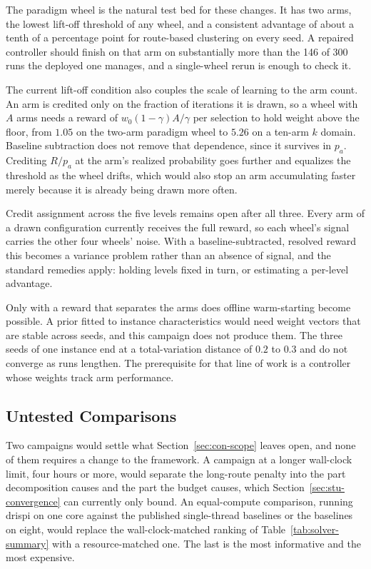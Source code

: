 The paradigm wheel is the natural test bed for these changes. It has two arms,
the lowest lift-off threshold of any wheel, and a consistent advantage of about
a tenth of a percentage point for route-based clustering on every seed. A
repaired controller should finish on that arm on substantially more than the
146 of 300 runs the deployed one manages, and a single-wheel rerun is enough to
check it.

The current lift-off condition also couples the scale of learning to the arm count. An
arm is credited only on the fraction of iterations it is drawn, so a wheel with
$A$ arms needs a reward of $w_0(1-\gamma)A/\gamma$ per selection to hold weight
above the floor, from $1.05$ on the two-arm paradigm wheel to $5.26$ on a
ten-arm $k$ domain. Baseline subtraction does not remove that dependence, since
it survives in $p_a$. Crediting $R/p_a$ at the arm's realized
probability goes further and equalizes the threshold as
the wheel drifts, which would also stop an arm accumulating faster merely
because it is already being drawn more often.

Credit assignment across the five levels remains open after all three. Every
arm of a drawn configuration currently receives the full reward, so each wheel's
signal carries the other four wheels' noise. With a baseline-subtracted,
resolved reward this becomes a variance problem rather than an absence of
signal, and the standard remedies apply: holding levels fixed in turn, or
estimating a per-level advantage.

Only with a reward that separates the arms does offline warm-starting become
possible. A prior fitted to instance characteristics would need weight vectors
that are stable across seeds, and this campaign does not produce them. The
three seeds of one instance end at a total-variation distance of $0.2$ to $0.3$ and do
not converge as runs lengthen. The prerequisite for that line of work is a
controller whose weights track arm performance.

\subsection{Untested Comparisons}
\label{sec:con-comparisons}

Two campaigns would settle what Section~\ref{sec:con-scope} leaves
open, and none of them requires a change to the framework. A
campaign at a longer wall-clock limit, four hours or more, would separate the
long-route penalty into the part decomposition causes and the part the budget
causes, which Section~\ref{sec:stu-convergence} can currently only bound.
An equal-compute comparison, running \gls{drispi} on one core against the published
single-thread baselines or the baselines on eight, would replace the
wall-clock-matched ranking of Table~\ref{tab:solver-summary} with a
resource-matched one. The last is the most informative and the most expensive.

